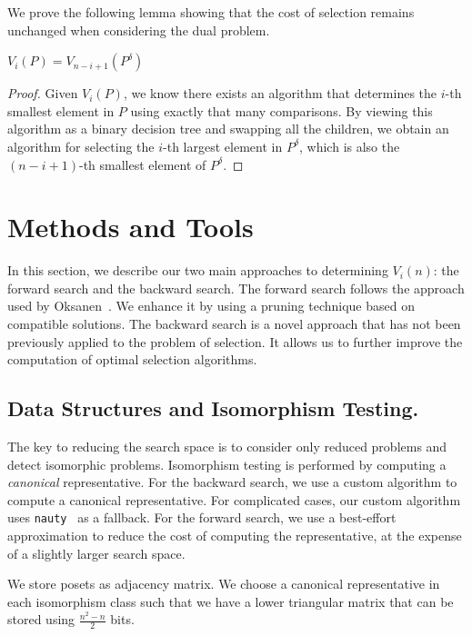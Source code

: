 \documentclass[a4paper,UKenglish,cleveref, autoref, thm-restate, anonymous]{lipics-v2021}
\newcommand{\dual}[1]{{#1}^{\delta}}
\begin{document}
We prove the following lemma showing that the cost of selection remains unchanged when considering the dual problem.

\begin{lemma} \label{lemma:dual_poset_allowed}
  $V_i(P) = V_{n - i + 1}(\dual{P})$
\end{lemma}

\begin{proof}
  Given $V_i(P)$, we know there exists an algorithm that determines the $i$-th smallest element in $P$ using exactly that many comparisons.
  By viewing this algorithm as a binary decision tree and swapping all the children, we obtain an algorithm for selecting the $i$-th largest element in $\dual{P}$, which is also the $(n - i + 1)$-th smallest element of $\dual{P}$.
\end{proof}

\section{Methods and Tools}

In this section, we describe our two main approaches to determining $V_i(n)$: the forward search and the backward search.
The forward search follows the approach used by Oksanen~\cite{Oksanen2006}.
We enhance it by using a pruning technique based on compatible solutions.
The backward search is a novel approach that has not been previously applied to the problem of selection.
It allows us to further improve the computation of optimal selection algorithms.%

\subsection{Data Structures and Isomorphism Testing.}
The key to reducing the search space is to consider only reduced problems and detect isomorphic problems.
Isomorphism testing is performed by computing a \emph{canonical} representative.
For the backward search, we use a custom algorithm to compute a canonical representative.
For complicated cases, our custom algorithm uses \texttt{nauty}~\cite{MCKAY201494} as a fallback.
For the forward search, we use a best-effort approximation to reduce the cost of computing the representative, at the expense of a slightly larger search space.

We store posets as adjacency matrix.
We choose a canonical representative in each isomorphism class such that we have a lower triangular matrix that can be stored using $\frac{n^2 - n}{2}$ bits.
\end{document}

